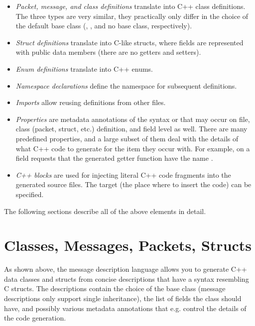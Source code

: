 \begin{itemize}
  \item \textit{Packet, message, and class definitions} translate into C++ class
    definitions. The three types are very similar, they practically only differ
    in the choice of the default base class (,
    , and no base class, respectively).
  \item \textit{Struct definitions} translate into C-like structs, where fields
    are represented with public data members (there are no getters and setters).
  \item \textit{Enum definitions} translate into C++ enums.
  \item \textit{Namespace declarations} define the namespace for subsequent definitions.
  \item \textit{Imports} allow reusing definitions from other  files.
  \item \textit{Properties} are metadata annotations of the syntax 
    or  that may occur on file, class (packet, struct, etc.)
    definition, and field level as well. There are many predefined properties,
    and a large subset of them deal with the details of what C++ code to
    generate for the item they occur with. For example, 
    on a field requests that the generated getter function have the name .
  \item \textit{C++ blocks} are used for injecting literal C++ code fragments
    into the generated source files. The target (the place where to insert the
    code) can be specified.
\end{itemize}

The following sections describe all of the above elements in detail.


\section{Classes, Messages, Packets, Structs}
\label{sec:msg-defs:classes-messages-packets-structs}

As shown above, the message description language allows you to generate C++ data
classes and structs from concise descriptions that have a syntax resembling C
structs. The descriptions contain the choice of the base class (message
descriptions only support single inheritance), the list of fields the class
should have, and possibly various metadata annotations that e.g. control the
details of the code generation.

